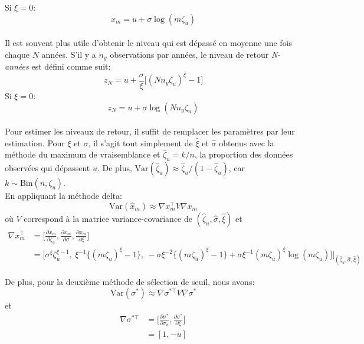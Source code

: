 \documentclass[11pt]{report}
\numberwithin{equation}{section}
\begin{document}
Si $\xi =0$:
\begin{equation}\label{eq:1.2.10}
x_m = u + \sigma\log(m\zeta_u)
\end{equation}
\\

Il est souvent plus utile d'obtenir le niveau  qui est dépassé en moyenne une fois chaque $N$ années. S'il y a $n_y$ observations par années, le niveau de retour \textit{N-années} est défini comme suit:
\begin{equation}\label{eq:1.2.11}
z_N = u + \frac{\sigma}{\xi} \Big[(Nn_y \zeta_u)^\xi -1\Big]
\end{equation}
Si $\xi =0$:
\begin{equation}\label{eq:1.2.12}
z_N = u + \sigma\log(Nn_y\zeta_u)
\end{equation} 
\\

Pour estimer les niveaux de retour, il suffit de remplacer les paramètres par leur estimation. Pour $\xi$ et $\sigma$, il s'agit tout simplement de $\hat\xi$ et $\hat\sigma$ obtenus avec la méthode du maximum de vraisemblance et $\hat\zeta_u = k/n$, la proportion des données observées qui dépassent $u$. De plus, $\text{Var}(\hat\zeta_u) \approx \hat\zeta_u/(1- \hat\zeta_u)$, car $k \sim \text{Bin}(n,\zeta_u)$. \\

En appliquant la méthode delta:
\begin{equation}\label{eq:1.2.13}
\text{Var}(\hat{x}_m) \approx \nabla x^{\top}_m V \nabla x_m
\end{equation}
où $V$ correspond à la matrice variance-covariance de $(\hat\zeta_u,\hat\sigma, \hat\xi)$ et
\begin{equation}\label{eq:1.2.14}
\begin{split}
\nabla x^{\top}_m &= \Big[ \frac{\partial x_m}{\partial \zeta_u}, \frac{\partial x_m}{\partial \sigma}, \frac{\partial x_m}{\partial \xi}\Big] \\
&= \Big[\sigma^\xi \zeta^{\xi -1}_u,\ \xi^{-1} \{(m\zeta_u)^{\xi} -1\},\ -\sigma\xi^{-2}\{(m\zeta_u)^{\xi} -1\} + \sigma\xi^{-1}(m\zeta_u)^{\xi}\log(m\zeta_u)\Big]\Bigg|_{(\hat\zeta_u, \hat\sigma, \hat\xi)}
\end{split}
\end{equation}

De plus, pour la deuxième méthode de sélection de seuil, nous avons:
\begin{equation}\label{eq:1.2.15}
\text{Var}(\sigma^*) \approx \nabla \sigma^{*\top} V \nabla \sigma^*
\end{equation}
et 
\begin{equation}\label{eq:1.2.16}
\begin{split}
\nabla \sigma^{*\top} &= \Bigg[ \frac{\partial \sigma^*}{\partial \sigma_u}, \frac{\partial \sigma^*}{\partial \xi}\Bigg] \\
    &= [1, -u]
\end{split}
\end{equation}
\end{document}
